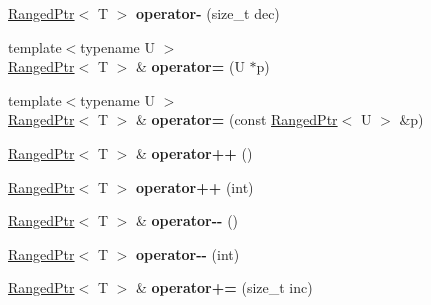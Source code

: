 \begin{DoxyCompactItemize}
\item 
\hypertarget{classmozilla_1_1_ranged_ptr_a1682c6006f751a1328efaec8532060f9}{\hyperlink{classmozilla_1_1_ranged_ptr}{Ranged\-Ptr}$<$ T $>$ {\bfseries operator-\/} (size\-\_\-t dec)}\label{classmozilla_1_1_ranged_ptr_a1682c6006f751a1328efaec8532060f9}

\item 
\hypertarget{classmozilla_1_1_ranged_ptr_ace41aefd3f051e12ce50258e0e76a4c7}{{\footnotesize template$<$typename U $>$ }\\\hyperlink{classmozilla_1_1_ranged_ptr}{Ranged\-Ptr}$<$ T $>$ \& {\bfseries operator=} (U $\ast$p)}\label{classmozilla_1_1_ranged_ptr_ace41aefd3f051e12ce50258e0e76a4c7}

\item 
\hypertarget{classmozilla_1_1_ranged_ptr_ae41e14602fa1e56688e8b9fec49b089d}{{\footnotesize template$<$typename U $>$ }\\\hyperlink{classmozilla_1_1_ranged_ptr}{Ranged\-Ptr}$<$ T $>$ \& {\bfseries operator=} (const \hyperlink{classmozilla_1_1_ranged_ptr}{Ranged\-Ptr}$<$ U $>$ \&p)}\label{classmozilla_1_1_ranged_ptr_ae41e14602fa1e56688e8b9fec49b089d}

\item 
\hypertarget{classmozilla_1_1_ranged_ptr_a253c74dda1aff199aed8dae448e7838d}{\hyperlink{classmozilla_1_1_ranged_ptr}{Ranged\-Ptr}$<$ T $>$ \& {\bfseries operator++} ()}\label{classmozilla_1_1_ranged_ptr_a253c74dda1aff199aed8dae448e7838d}

\item 
\hypertarget{classmozilla_1_1_ranged_ptr_a2d39b893d33f2c48d1b905304ac45cf3}{\hyperlink{classmozilla_1_1_ranged_ptr}{Ranged\-Ptr}$<$ T $>$ {\bfseries operator++} (int)}\label{classmozilla_1_1_ranged_ptr_a2d39b893d33f2c48d1b905304ac45cf3}

\item 
\hypertarget{classmozilla_1_1_ranged_ptr_a40e3c07113395a2385d0b08b1c571a68}{\hyperlink{classmozilla_1_1_ranged_ptr}{Ranged\-Ptr}$<$ T $>$ \& {\bfseries operator-\/-\/} ()}\label{classmozilla_1_1_ranged_ptr_a40e3c07113395a2385d0b08b1c571a68}

\item 
\hypertarget{classmozilla_1_1_ranged_ptr_af2e4b85d1e0b7e90d26caf767822f7b4}{\hyperlink{classmozilla_1_1_ranged_ptr}{Ranged\-Ptr}$<$ T $>$ {\bfseries operator-\/-\/} (int)}\label{classmozilla_1_1_ranged_ptr_af2e4b85d1e0b7e90d26caf767822f7b4}

\item 
\hypertarget{classmozilla_1_1_ranged_ptr_a8c2149fea81128e98e7ff4ee79419241}{\hyperlink{classmozilla_1_1_ranged_ptr}{Ranged\-Ptr}$<$ T $>$ \& {\bfseries operator+=} (size\-\_\-t inc)}\label{classmozilla_1_1_ranged_ptr_a8c2149fea81128e98e7ff4ee79419241}


\end{DoxyCompactItemize}
